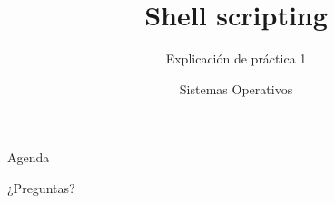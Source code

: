 


\title{Shell scripting}
\author{Sistemas Operativos}
\subtitle{Explicación de práctica 1}



\begin{frame}
  \titlepage
\end{frame}

\begin{frame}{Agenda}
  \tableofcontents
\end{frame}



\begin{frame}{}
  \begin{center}
    \vfill
    \huge ¿Preguntas?
    \vfill
  \end{center}
\end{frame}



